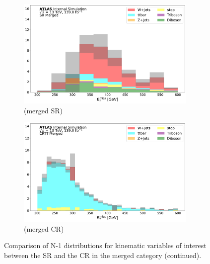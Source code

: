 \begin{figure}[htbp]
   \begin{subfigure}{0.45\textwidth}
     \includegraphics[width = 0.95\textwidth]{Figures/App_SR_CR_distributions/SR1L_Merged/MetTST_met_N_1.pdf}
    \caption{\met (merged SR)}
     \end{subfigure}
    \begin{subfigure}{0.45\textwidth}
     \includegraphics[width = 0.95\textwidth]{Figures/App_SR_CR_distributions/CRTT_Merged/MetTST_met_N_1.pdf}
     \caption{\met (merged \ttbar CR)}
     \end{subfigure}
     \caption{Comparison of N-1 distributions for kinematic variables of interest between the SR and the \ttbar CR in the merged category (continued).}
  \end{figure}

\captionsetup[figure]{list=yes}

